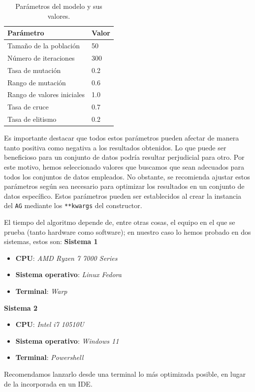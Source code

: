 \documentclass[conference,a4paper]{IEEEtran}
\begin{document}
\begin{table}[H]
\centering
\caption{Parámetros del modelo y sus valores.}
\label{tab:parametros}
\begin{tabular}{ll}
\toprule
\textbf{Parámetro} & \textbf{Valor} \\
\midrule
Tamaño de la población         & 50 \\
Número de iteraciones          & 300 \\
Tasa de mutación               & 0.2 \\
Rango de mutación              & 0.6 \\
Rango de valores iniciales     & 1.0 \\
Tasa de cruce                  & 0.7 \\
Tasa de elitismo               & 0.2 \\
\bottomrule
\end{tabular}
\end{table}


Es importante destacar que todos estos parámetros pueden afectar de manera tanto positiva como negativa a los resultados obtenidos. Lo que puede ser beneficioso para un conjunto de datos podría resultar perjudicial para otro. Por este motivo, hemos seleccionado valores que buscamos que sean adecuados para todos los conjuntos de datos empleados. No obstante, se recomienda ajustar estos parámetros según sea necesario para optimizar los resultados en un conjunto de datos específico. Estos parámetros pueden ser establecidos al crear la instancia del \texttt{AG} mediante los \texttt{**kwargs} del constructor.

El tiempo del algoritmo depende de, entre otras cosas, el equipo en el que se prueba (tanto hardware como software); en nuestro caso lo hemos probado en dos sistemas, estos son:
\textbf{Sistema 1}
\begin{itemize}
    \item \textbf{CPU}: \textit{AMD Ryzen 7 7000 Series}
    \item \textbf{Sistema operativo}: \textit{Linux Fedora}
    \item \textbf{Terminal}: \textit{Warp}
\end{itemize}


\textbf{Sistema 2}
\begin{itemize}
    \item \textbf{CPU}: \textit{Intel i7 10510U}
    \item \textbf{Sistema operativo}: \textit{Windows 11}
    \item \textbf{Terminal}: \textit{Powershell}
\end{itemize}
Recomendamos lanzarlo desde una terminal lo más optimizada posible, en lugar de la incorporada en un IDE.
\end{document}
